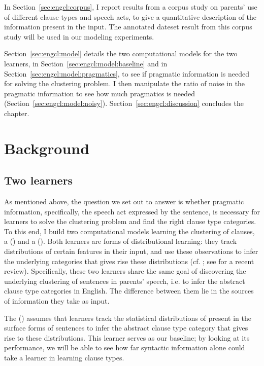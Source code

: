 In Section~\ref{sec:engcl:corpus}, I report results from a corpus study on parents' use of different clause types and speech acts, to give a quantitative description of the information present in the input. The annotated dateset result from this corpus study will be used in our modeling experiments.

Section~\ref{sec:engcl:model} details the two computational models for the two learners, \dlearnerabbr{} in Section~\ref{sec:engcl:model:baseline} and \plearnerabbr{} in Section~\ref{sec:engcl:model:pragmatics}, to see if pragmatic information is needed for solving the clustering problem. I then manipulate the ratio of noise in the pragmatic information to see how much pragmatics is needed (Section~\ref{sec:engcl:model:noisy}). Section~\ref{sec:engcl:discussion} concludes the chapter. 


\section{Background}
\label{sec:engcl:background}

\subsection{Two learners} 
\label{sec:engcl:bg:learners}
As mentioned above, the question we set out to answer is whether pragmatic information, specifically, the speech act expressed by the sentence, is necessary for learners to solve the clustering problem and find the right clause type categories. To this end, I build two computational models learning the clustering of clauses, a \text{\distlearner{}} (\dlearnerabbr{}) and a \text{\praglearner{}} (\plearnerabbr{}). Both learners are forms of distributional learning: they track distributions of certain features in their input, and use these observations to infer the underlying categories that gives rise these distributions
(cf. \cite{feldman2013,gagliardi2017modeling,perkins2022vmodel,perkins2019,nguyenwilson2021}; see \cite{pearl2020review} for a recent review). Specifically, these two learners share the same goal of discovering the underlying clustering of sentences in parents' speech, i.e. to infer the abstract clause type categories in English. The difference between them lie in the sources of information they take as input. 

The \tbf{\distlearner{}} (\dlearnerabbr{}) assumes that learners track the statistical distributions of  present in the surface forms of sentences to infer the abstract clause type category that gives rise to these distributions. This learner serves as our baseline; by looking at its performance, we will be able to see how far syntactic information alone could take a learner in learning clause types. 

